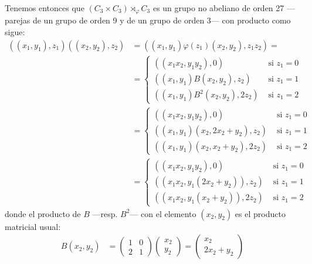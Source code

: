 \documentclass[a4paper, 11pt]{article}
\begin{document}
\begin{solucion}
      Tenemos entonces que $(C_3 \times C_3) \rtimes_{\varphi} C_3$ es un grupo no abeliano de orden 27 ---parejas de un grupo de orden 9 y de un grupo de orden 3--- con producto como sigue:
      \begin{align*}
          ((x_1,y_1),z_1)((x_2,y_2),z_2) &= ((x_1,y_1)\varphi(z_1)(x_2,y_2),z_1 z_2) =\\
          &= \begin{cases}
            ((x_1 x_2,y_1 y_2),0) &\textrm{ si } z_1=0 \\
            ((x_1,y_1)B(x_2,y_2),z_2) &\textrm{ si } z_1=1 \\
            ((x_1,y_1)B^2(x_2,y_2),2z_2) &\textrm{ si } z_1=2
        \end{cases}\\
        &= \begin{cases}
          ((x_1 x_2,y_1 y_2),0) &\textrm{ si } z_1=0 \\
          ((x_1,y_1)(x_2,2x_2+y_2),z_2) &\textrm{ si } z_1=1 \\
          ((x_1,y_1)(x_2,x_2+y_2),2z_2) &\textrm{ si } z_1=2
        \end{cases}\\
        &= \begin{cases}
          ((x_1 x_2,y_1 y_2),0) &\textrm{ si } z_1=0 \\
          ((x_1 x_2,y_1(2x_2+y_2)),z_2) &\textrm{ si } z_1=1 \\
          ((x_1 x_2,y_1(x_2+y_2)),2z_2) &\textrm{ si } z_1=2
        \end{cases}
    \end{align*}
    donde el producto de $B$ ---resp. $B^2$--- con el elemento $(x_2,y_2)$ es el producto matricial usual:
    \begin{align*}
        B(x_2,y_2) &= \left(
            \begin{array}{cc}
                1 & 0 \\
                2 & 1
            \end{array}
            \right) \left(
            \begin{array}{c}
                x_2 \\
                y_2
            \end{array}
            \right) = \left(
            \begin{array}{c}
                x_2 \\
                2x_2+y_2
            \end{array}
            \right) \\

\end{align*}
\end{solucion}
\end{document}
